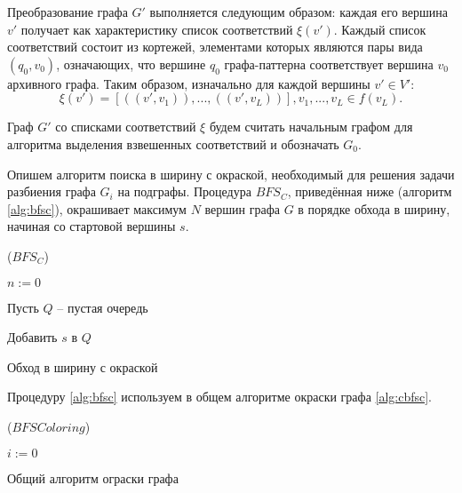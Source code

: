 Преобразование графа $G'$ выполняется следующим образом: каждая его вершина $v'$ получает как характеристику список соответствий $\xi(v')$. Каждый список соответствий состоит из кортежей, элементами которых являются пары вида $(q_0, v_0)$, означающих, что вершине $q_0$ графа-паттерна соответствует вершина $v_0$ архивного графа. Таким образом, изначально для каждой вершины $v' \in V'$:
\[\xi(v') = [((v', v_1)), ..., ((v', v_L))], v_1, ..., v_L \in f(v_L).\]

Граф $G'$ со списками соответствий $\xi$ будем считать начальным графом для алгоритма выделения взвешенных соответствий и обозначать $G_0$.

Опишем алгоритм поиска в ширину с окраской, необходимый для решения задачи разбиения графа $G_i$ на подграфы. Процедура $BFS_C$, приведённая ниже (алгоритм \ref{alg:bfsc}), окрашивает максимум $N$ вершин графа $G$ в порядке обхода в ширину, начиная со стартовой вершины $s$.

\begin{algorithm}[H]
	\Large
	\Begin($BFS_C$){
		$n := 0$
		
		Пусть $Q$ -- пустая очередь
		
		Добавить $s$ в $Q$
		
		
	}
	
	\caption{Обход в ширину с окраской}
	\label{alg:bfsc}
\end{algorithm}

Процедуру \ref{alg:bfsc} используем в общем алгоритме окраски графа \ref{alg:cbfsc}.

\begin{algorithm}[H]
	\Large
	\Begin($BFS Coloring$){
		
		
		$i := 0$
		
		
	}
	
	\caption{Общий алгоритм ограски графа}
	\label{alg:cbfsc}
\end{algorithm}

